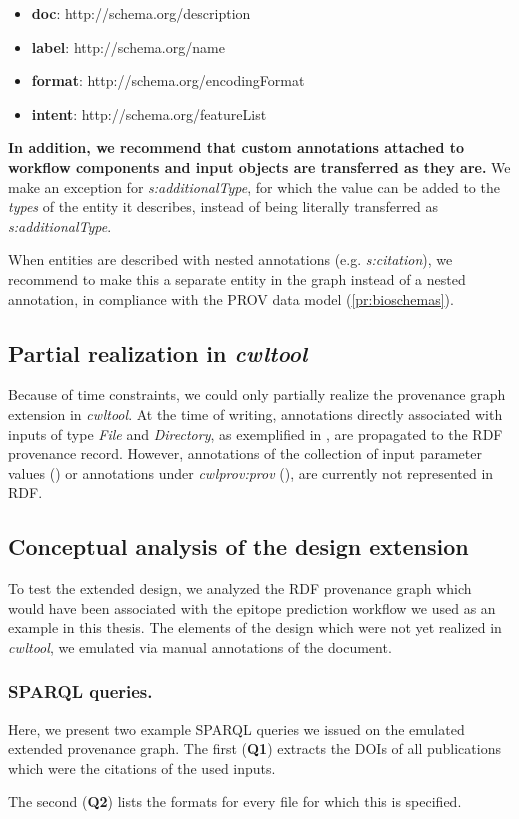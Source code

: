 \begin{itemize}
    \item \textbf{doc}: http://schema.org/description
    \item \textbf{label}: http://schema.org/name
    \item \textbf{format}: http://schema.org/encodingFormat
    \item \textbf{intent}: http://schema.org/featureList
\end{itemize}

\textbf{In addition, we recommend that custom annotations attached to workflow components and input objects are transferred as they are.} We make an exception for \emph{s:additionalType}, for which the value can be added to the \emph{types} of the entity it describes, instead of being literally transferred as \emph{s:additionalType}.

When entities are described with nested annotations (e.g. \emph{s:citation}), we recommend to make this a separate entity in the graph instead of a nested annotation, in compliance with the PROV data model (\ref{pr:bioschemas}).

\subsection{Partial realization in \emph{cwltool}}
\label{sec:realization}
Because of time constraints, we could only partially realize the provenance graph extension in \emph{cwltool}. At the time of writing, annotations directly associated with inputs of type \emph{File} and \emph{Directory}, as exemplified in \emph{}, are propagated to the RDF provenance record. However, annotations of the collection of input parameter values (\emph{}) or annotations under \emph{cwlprov:prov} (\emph{}), are currently not represented in RDF.

\subsection{Conceptual analysis of the design extension}
\label{sec:ext_analysis}

To test the extended design, we analyzed the RDF provenance graph which would have been associated with the epitope prediction workflow we used as an example in this thesis. The elements of the design which were not yet realized in \emph{cwltool}, we emulated via manual annotations of the document. 

\subsubsection{SPARQL queries.}

Here, we present two example SPARQL queries we issued on the emulated extended provenance graph. The first (\textbf{Q1}) extracts the DOIs of all publications which were the citations of the used inputs.

The second (\textbf{Q2}) lists the formats for every file for which this is specified.